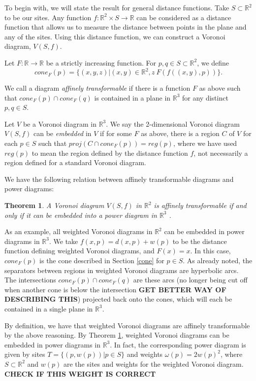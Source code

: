 \documentclass[a4paper, 11pt]{article}
\newtheorem{theorem}{Theorem}[section]
\newcommand{\R}{\mathbb{R}}
\begin{document}
To begin with, we will state the result for general distance functions. Take $S \subset \R^2$ to be our sites. Any function $f: \R^2 \times S \to \R$
can be considered as a distance function that allows us to measure the distance between points in the plane and any of the sites. Using this distance
function, we can construct a Voronoi diagram, $V(S,f)$.

Let $F: \R \to \R$ be a strictly increasing function. For $p,q \in S \subset \R^2$, we define
\[ cone_F(p) = \{ (x,y,z) | (x,y) \in \R^2, z \ F( f( (x,y), p) ) \}. \]

We call a diagram \textit{affinely transformable} if there is a function $F$ as above such that $cone_F(p) \cap cone_F(q)$ is contained in a plane in $\R^3$ for any distinct
$p,q \in S$.

Let $V$ be a Voronoi diagram in $\R^3$. We say the 2-dimensional Voronoi diagram $V(S,f)$ can be \textit{embedded} in $V$ if for some $F$ as above,
there is a region $C$ of $V$ for each $p \in S$ such that $proj( C \cap cone_F(p)) = reg(p)$, where we have used $reg(p)$ to mean the region defined
by the distance function $f$, not necessarily a region defined for a standard Voronoi diagram.

We have the following relation between affinely transformable diagrams and power diagrams:

\begin{theorem}
  \label{thm:affine}
  A Voronoi diagram $V(S,f)$ in $\R^2$ is affinely transformable if and only if it can be embedded into a power diagram in $\R^3$
  \cite{aurenhammer_additive}.
\end{theorem}

As an example, all weighted Voronoi diagrams in $\R^2$ can be embedded in power diagrams in $\R^3$. We take $f(x,p) = d(x,p) + w(p)$ to be the
distance function defining weighted Voronoi diagrams, and $F(x) = x$. In this case, $cone_F(p)$ is the cone described in Section \ref{cone} for $p \in
S$. As already noted, the separators between regions in weighted Voronoi diagrams are hyperbolic arcs. The intersections $cone_F(p) \cap cone_F(q)$
are these arcs (no longer being cut off when another cone is below the intersection \textbf{GET BETTER WAY OF DESCRIBING THIS}) projected back onto
the cones, which will each be contained in a single plane in $\R^3$.

By definition, we have that weighted Voronoi diagrams are affinely transformable by the above reasoning. By Theorem \ref{thm:affine}, weighted Voronoi
diagrams can be embedded in power diagrams in $\R^3$. In fact, the corresponding power diagram is given by sites $T = \{ (p, w(p)) | p \in S \}$ and
weights $\omega(p) = 2 w(p)^2$, where $S \subset \R^2$ and $w(p)$ are the sites and weights for the weighted Voronoi diagram. \textbf{CHECK IF THIS
WEIGHT IS CORRECT}
\end{document}
